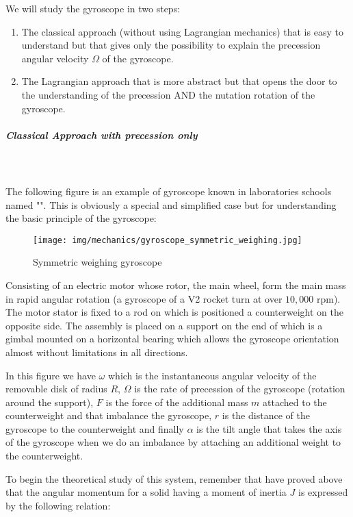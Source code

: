 	We will study the gyroscope in two steps:
	\begin{enumerate}
         \item The classical approach (without using Lagrangian mechanics) that is easy to understand but that gives only the possibility to explain the precession angular velocity $\Omega$ of the gyroscope.

         \item The Lagrangian approach that is more abstract but that opens the door to the understanding of the precession AND the nutation rotation of the gyroscope.
     \end{enumerate}

	\pagebreak
	\subparagraph{Classical Approach with precession only}\mbox{}\\\\
	The following figure is an example of gyroscope known in laboratories schools named "". This is obviously a special and simplified case but for understanding the basic principle of the gyroscope:
     \begin{figure}[H]
		\centering
		\texttt{[image: img/mechanics/gyroscope\_symmetric\_weighing.jpg]}
		\caption{Symmetric weighing gyroscope}
	\end{figure}
	Consisting of an electric motor whose rotor, the main wheel, form the main mass in rapid angular rotation (a gyroscope of a V2 rocket turn at over $10,000$ rpm). The motor stator is fixed to a rod on which is positioned a counterweight on the opposite side. The assembly is placed on a support on the end of which is a gimbal mounted on a horizontal bearing which allows the gyroscope orientation almost without limitations in all directions.
	
	In this figure we have $\omega$ which is the instantaneous angular velocity of the removable disk of radius $R$, $\Omega$ is the rate of precession of the gyroscope (rotation around the support), $F$ is the force of the additional mass $m$ attached to the counterweight and that imbalance the gyroscope, $r$ is the distance of the gyroscope to the counterweight and finally $\alpha$ is the tilt angle that takes the axis of the gyroscope when we do an imbalance by attaching an additional weight to the counterweight.
	
	To begin the theoretical study of this system, remember that have proved above that the angular momentum for a solid having a moment of inertia $J$ is expressed by the following relation:
     

